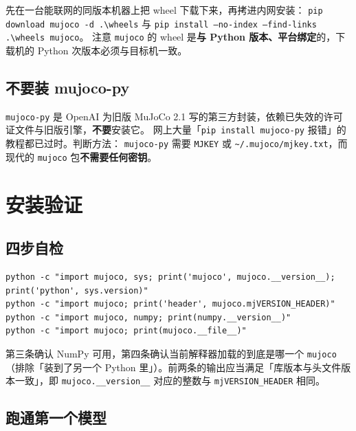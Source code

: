 \begin{tipbox}[内网与离线机器]
	先在一台能联网的同版本机器上把 wheel 下载下来，再拷进内网安装：
	\texttt{pip download mujoco -d .\textbackslash{}wheels} 与
	\texttt{pip install --no-index --find-links .\textbackslash{}wheels mujoco}。
	注意 \texttt{mujoco} 的 wheel 是\textbf{与 Python 版本、平台绑定}的，下载机的 Python 次版本必须与目标机一致。
\end{tipbox}

\subsection{不要装 mujoco-py}

\begin{warnbox}
	\texttt{mujoco-py} 是 OpenAI 为旧版 MuJoCo 2.1 写的第三方封装，依赖已失效的许可证文件与旧版引擎，\textbf{不要}安装它。
	网上大量「\texttt{pip install mujoco-py} 报错」的教程都已过时。判断方法：
	\texttt{mujoco-py} 需要 \texttt{MJKEY} 或 \texttt{\textasciitilde{}/.mujoco/mjkey.txt}，而现代的 \texttt{mujoco} 包\textbf{不需要任何密钥}。
\end{warnbox}

\section{安装验证}

\subsection{四步自检}

\begin{lstlisting}[style=shell]
python -c "import mujoco, sys; print('mujoco', mujoco.__version__); print('python', sys.version)"
python -c "import mujoco; print('header', mujoco.mjVERSION_HEADER)"
python -c "import mujoco, numpy; print(numpy.__version__)"
python -c "import mujoco; print(mujoco.__file__)"
\end{lstlisting}

第三条确认 NumPy 可用，第四条确认当前解释器加载的到底是哪一个 \texttt{mujoco}（排除「装到了另一个 Python 里」）。前两条的输出应当满足「库版本与头文件版本一致」，即 \texttt{mujoco.\_\_version\_\_} 对应的整数与 \texttt{mjVERSION\_HEADER} 相同。

\subsection{跑通第一个模型}

